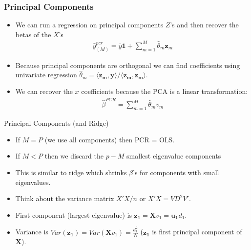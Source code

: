 \documentclass[xcolor=pdftex,dvipsnames,table,mathserif,aspectratio=169]{beamer}
\begin{document}
\begin{frame}
\frametitle{Principal Components}
\begin{itemize}
\item We can run a regression on principal components $Z$'s and then recover the betas of the $X$'s
\begin{eqnarray*}
\hat{y}_{(M)}^{pcr} = \overline{y} \mathbf{1} + \sum_{m=1}^M \hat{\theta}_m \mathbf{z}_m
\end{eqnarray*}
\item Because principal components are orthogonal we can find coefficients using univariate regression $\hat{\theta}_m = \langle \mathbf{z_m} , \mathbf{y} \rangle / \langle \mathbf{z_m} , \mathbf{z_m} \rangle$.
\item We can recover the $x$ coefficients because the PCA is a linear transformation:
\begin{eqnarray*}
\hat{\beta}^{PCR} = \sum_{m=1}^M \hat{\theta}_m v_m
\end{eqnarray*}
\end{itemize}
\end{frame}

\begin{frame}{Principal Components (and Ridge)}
\begin{itemize}
\item If $M=P$ (we use all components) then PCR = OLS.
\item If $M < P$ then we discard the $p-M$ smallest eigenvalue components
\item This is similar to ridge which shrinks $\beta$'s for components with small eigenvalues.
\item Think about the variance matrix $X'X/n$ or $X' X = V D^2 V'$.
\item First component (largest eigenvalue) is $\mathbf{z_1} = \mathbf{X} v_1 = \mathbf{u_1} d_1$.
\item Variance is $Var(\mathbf{z_1}) = Var (\mathbf{X} v_1) = \frac{d_1^2}{N}$ ($\mathbf{z_1}$ is first principal component of $\mathbf{X}$).
\end{itemize}
\end{frame}
\end{document}
